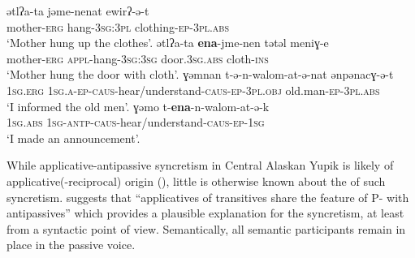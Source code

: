 \ea {} \citep[212, 215f.]{dunn:1999}
\ea\label{ex:Chukchi:hang:a}
	\gll	ətlʔa-ta jəme-nenat ewirʔ-ə-t \\
			mother-\textsc{erg} hang-\textsc{3sg:3pl} clothing-\textsc{ep-3pl.abs} \\
	\glt	‘Mother hung up the clothes’.
\ex\label{ex:Chukchi:hang:b}
	\gll	ətlʔa-ta \textbf{ena}-jme-nen tətəl meniɣ-e \\
			mother-\textsc{erg} \textsc{appl}-hang-\textsc{3sg:3sg} door.\textsc{3sg.abs} cloth-\textsc{ins} \\
	\glt	‘Mother hung the door with cloth’.
\ex\label{ex:Chukchi:inform:a}
	\gll	ɣəmnan t-ə-n-walom-at-ə-nat ənpənacɣ-ə-t \\
			\textsc{1sg.erg} \textsc{1sg.a-ep-caus}-hear/understand-\textsc{caus-ep-3pl.obj} old.man-\textsc{ep-3pl.abs} \\
	\glt	‘I informed the old men’.
\ex\label{ex:Chukchi:inform:b}
	\gll	ɣəmo t-\textbf{ena}-n-walom-at-ə-k \\
			\textsc{1sg.abs} \textsc{1sg-antp-caus}-hear/understand-\textsc{caus-ep-1sg} \\
	\glt	‘I made an announcement’.
	\z 
\z

While applicative-antipassive syncretism in Central Alaskan Yupik is likely of applicative(-reciprocal) origin (), little is otherwise known about the  of such syncretism. \cite[24]{malchukov:2017} suggests that “applicatives of transitives share the feature of P- with antipassives” which provides a plausible explanation for the syncretism, at least from a syntactic point of view. Semantically, all semantic participants remain in place in the passive voice.

